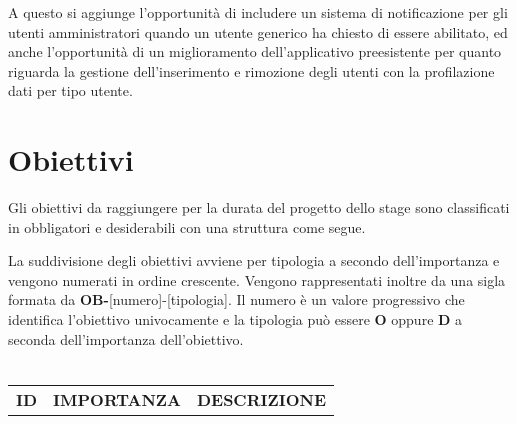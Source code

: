 A questo si aggiunge l'opportunità di includere un sistema di notificazione per gli utenti amministratori quando un utente generico ha chiesto di essere abilitato, ed anche l'opportunità di un miglioramento dell'applicativo preesistente per quanto riguarda  la gestione dell'inserimento e rimozione degli utenti con la profilazione dati per tipo utente.



\begin{table}
\section{Obiettivi}

Gli obiettivi da raggiungere per la durata del progetto dello stage sono classificati in obbligatori e desiderabili con una struttura come segue.

La suddivisione degli obiettivi avviene per tipologia a secondo dell'importanza e vengono numerati in ordine crescente. Vengono rappresentati inoltre da una sigla formata da \textbf{OB-}[numero]-[tipologia]. Il numero è un valore progressivo che identifica l'obiettivo univocamente e la tipologia può essere \textbf{O} oppure \textbf{D} a seconda dell'importanza dell'obiettivo. \\\\







\begin{tabular}{ |p{2cm}|p{3cm}|p{8cm}| }

 \hline
\textbf{ ID}   &  \textbf{IMPORTANZA}    &  \textbf{DESCRIZIONE} \\ 


\end{tabular}
\end{table}
